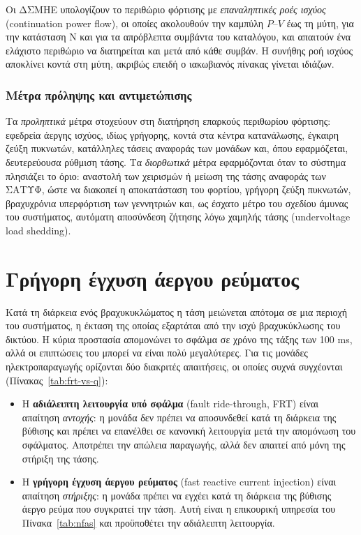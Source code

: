 Οι ΔΣΜΗΕ υπολογίζουν το περιθώριο φόρτισης με \emph{επαναληπτικές ροές ισχύος} (continuation
power flow), οι οποίες ακολουθούν την καμπύλη $P$--$V$ έως τη μύτη, για την κατάσταση N και για τα
απρόβλεπτα συμβάντα του καταλόγου, και απαιτούν ένα ελάχιστο περιθώριο να διατηρείται και μετά
από κάθε συμβάν. Η συνήθης ροή ισχύος αποκλίνει κοντά στη μύτη, ακριβώς επειδή ο ιακωβιανός
πίνακας γίνεται ιδιάζων.

\subsubsection{Μέτρα πρόληψης και αντιμετώπισης}

Τα \emph{προληπτικά} μέτρα στοχεύουν στη διατήρηση επαρκούς περιθωρίου φόρτισης: εφεδρεία
άεργης ισχύος, ιδίως γρήγορης, κοντά στα κέντρα κατανάλωσης, έγκαιρη ζεύξη πυκνωτών, κατάλληλες
τάσεις αναφοράς των μονάδων και, όπου εφαρμόζεται, δευτερεύουσα ρύθμιση τάσης. Τα
\emph{διορθωτικά} μέτρα εφαρμόζονται όταν το σύστημα πλησιάζει το όριο: αναστολή των χειρισμών
ή μείωση της τάσης αναφοράς των ΣΑΤΥΦ, ώστε να διακοπεί η αποκατάσταση του
φορτίου, γρήγορη ζεύξη πυκνωτών, βραχυχρόνια υπερφόρτιση των γεννητριών και, ως έσχατο μέτρο του
σχεδίου άμυνας του συστήματος, αυτόματη αποσύνδεση ζήτησης λόγω χαμηλής τάσης (undervoltage
load shedding).

\section{Γρήγορη έγχυση άεργου ρεύματος}
\label{sec:frt}

Κατά τη διάρκεια ενός βραχυκυκλώματος η τάση μειώνεται απότομα σε μια περιοχή του συστήματος,
η έκταση της οποίας εξαρτάται από την ισχύ βραχυκύκλωσης του δικτύου. Η κύρια προστασία
απομονώνει το σφάλμα σε χρόνο της τάξης των 100 ms, αλλά οι επιπτώσεις του μπορεί να είναι
πολύ μεγαλύτερες. Για τις μονάδες ηλεκτροπαραγωγής ορίζονται δύο διακριτές απαιτήσεις, οι
οποίες συχνά συγχέονται (Πίνακας~\ref{tab:frt-vs-q}):

\begin{itemize}
\item Η \textbf{αδιάλειπτη λειτουργία υπό σφάλμα} (fault ride-through, FRT) είναι
      απαίτηση \emph{αντοχής}: η μονάδα δεν πρέπει να αποσυνδεθεί κατά τη διάρκεια της
      βύθισης και πρέπει να επανέλθει σε κανονική λειτουργία μετά την απομόνωση του σφάλματος.
      Αποτρέπει την απώλεια παραγωγής, αλλά δεν απαιτεί από μόνη της στήριξη της τάσης.
\item Η \textbf{γρήγορη έγχυση άεργου ρεύματος} (fast reactive current injection) είναι
      απαίτηση \emph{στήριξης}: η μονάδα πρέπει να εγχέει κατά τη διάρκεια της βύθισης άεργο
      ρεύμα που συγκρατεί την τάση. Αυτή είναι η επικουρική υπηρεσία του
      Πίνακα~\ref{tab:nfas} και προϋποθέτει την αδιάλειπτη λειτουργία.
\end{itemize}

